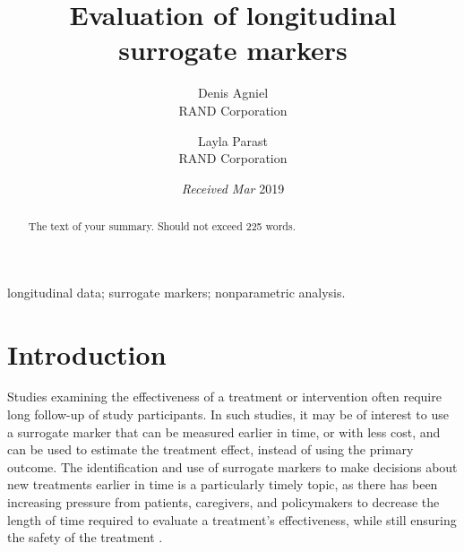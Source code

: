 \documentclass[useAMS,usenatbib,referee]{biom}
\title[]{Evaluation of longitudinal surrogate markers}
\author{ Denis Agniel \email{\href{mailto:dagniel@rand.org}{\nolinkurl{dagniel@rand.org}}} \\ RAND Corporation  \and
		 Layla Parast \email{\href{mailto:parast@rand.org}{\nolinkurl{parast@rand.org}}} \\ RAND Corporation 
	   }
\begin{document}
\date{{\it Received Mar} 2019}

\pagerange{\pageref{firstpage}--\pageref{lastpage}} 



\label{firstpage}


\begin{abstract}
The text of your summary. Should not exceed 225 words.
\end{abstract}

%
%

\begin{keywords}
longitudinal data; surrogate markers; nonparametric analysis.
\end{keywords}

\maketitle

  \def\sone{^{(1)}} \def\szero{^{(0)}}
\def\lin{^{(\text{lin})}}
\def\gam{^{(\text{gam})}}
\def\k{^{(\text{kern})}}
\def\subxo{_{\bX\sone}}
\def\subxz{_{\bX\szero}}
\def\mhalf{^{-\frac{1}{2}}}
\def\sumjp{\sum_{j=1}^p}
\def\suppxo{{\Ssc\sone}}
\def\suppxz{{\Ssc\szero}}
\def\Rbb{\mathbb{R}}

\section{Introduction}\label{intro}
Studies examining the effectiveness of a treatment or intervention often require long follow-up of study participants. In such studies, it may be of interest to use a surrogate marker that can be measured earlier in time, or with less cost, and can be used to estimate the treatment effect, instead of using the primary outcome. The identification and use of surrogate markers to make decisions about new treatments earlier in time is a particularly timely topic, as there has been increasing pressure from patients, caregivers, and policymakers to decrease the length of time required to evaluate a treatment's effectiveness, while still ensuring the safety of the treatment \citep{cleary2018contribution,stat}. 
\end{document}
